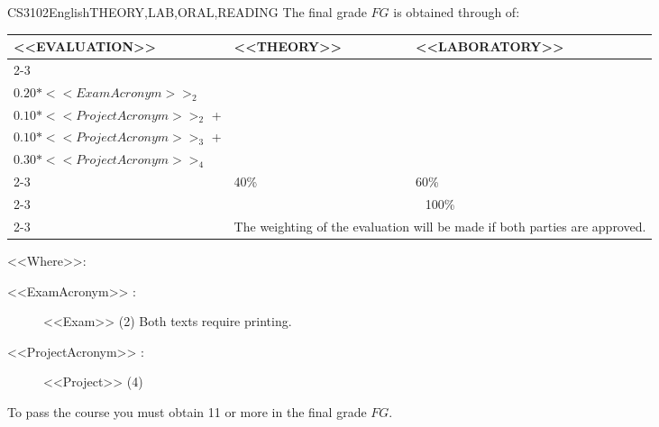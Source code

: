  \begin{evaluation}{CS3102}{English}{THEORY,LAB,ORAL,READING}
  The final grade $FG$ is obtained through of:

  \begin{tabularx}{0.9\textwidth}{|X|p{}|p{}|} \hline
  \multirow{4}{*}{\uppercase{<<Evaluation>>}} & \uppercase{<<Theory>>} & \uppercase{<<Laboratory>>} \\ \cline{2-3}
  & %
      \begin{minipage}{0.95\textwidth}
      \begin{tabular}{l}
        $0.20*<<ExamAcronym>>_{1}$  + \\
        $0.20*<<ExamAcronym>>_{2}$ 
      \end{tabular} 
      \end{minipage} 
  & %
      \begin{minipage}{0.95\textwidth}
      \begin{tabular}{l}
        $0.10*<<ProjectAcronym>>_{1}$  + \\
        $0.10*<<ProjectAcronym>>_{2}$  + \\
        $0.10*<<ProjectAcronym>>_{3}$  + \\
        $0.30*<<ProjectAcronym>>_{4}$
      \end{tabular} 
      \end{minipage}                 \\ \cline{2-3}
  
  & %
  40\% 
  & %
  60\% \\ \cline{2-3}
  & \multicolumn{2}{|c|}{100\%}  \\ \cline{2-3}
  & \multicolumn{2}{|c|}{The weighting of the evaluation will be made if both parties are approved.}  \\ \hline
  \end{tabularx}
    
  \vspace{2mm}
  \noindent <<Where>>:
  \begin{description}
      \item[<<ExamAcronym>> :] <<Exam>> (2) Both texts require printing.
      \item[<<ProjectAcronym>> :] <<Project>> (4)
  \end{description}
  
  \noindent To pass the course you must obtain 11 or more in the final grade $FG$.
  \end{evaluation}

